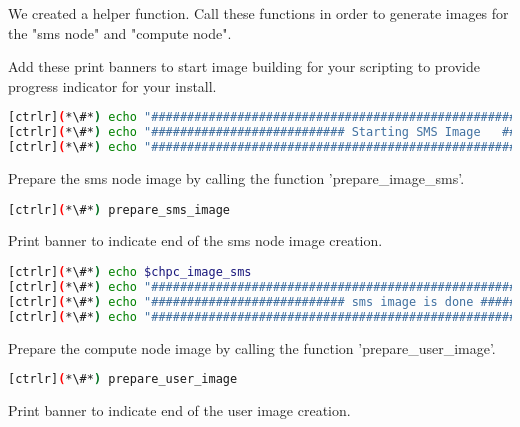 	We created a helper function. Call these functions in order to generate images for the "sms node" and "compute node".


	Add these print banners to start image building for your scripting to provide progress indicator for your install.

\begin{lstlisting}[language=bash,keywords={},upquote=true]
[ctrlr](*\#*) echo "########################################################################"
[ctrlr](*\#*) echo "########################### Starting SMS Image   ###########################"
[ctrlr](*\#*) echo "########################################################################"
\end{lstlisting}

	Prepare the sms node image by calling the function 'prepare\_image\_sms'.

\begin{lstlisting}[language=bash,keywords={},upquote=true]
[ctrlr](*\#*) prepare_sms_image
\end{lstlisting}


	Print banner to indicate end of the sms node image creation.

\begin{lstlisting}[language=bash,keywords={},upquote=true]
[ctrlr](*\#*) echo $chpc_image_sms
[ctrlr](*\#*) echo "########################################################################"
[ctrlr](*\#*) echo "########################### sms image is done ##########################"
[ctrlr](*\#*) echo "########################################################################"
\end{lstlisting}
	Prepare the compute node image by calling the function 'prepare\_user\_image'.

\begin{lstlisting}[language=bash,keywords={},upquote=true]
[ctrlr](*\#*) prepare_user_image
\end{lstlisting}

	Print banner to indicate end of the user image creation.
	
